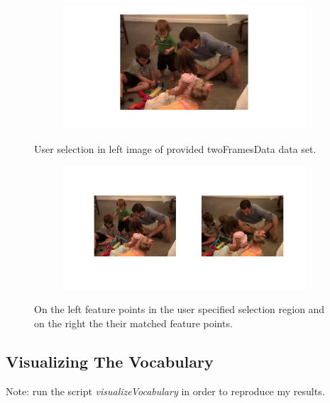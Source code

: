 \documentclass{paper}
\begin{document}
\begin{figure}[H]
\centering
\begin{subfigure}{1.0\textwidth}
\includegraphics[width=\textwidth]{figures/raw_matches/kids/selMatch2}
\end{subfigure}
\caption{User selection in left image of provided twoFramesData data set.}
\label{fig:kids2_raw_sel}
\end{figure}

\begin{figure}[H]
\centering
\begin{subfigure}{1.0\textwidth}
\includegraphics[width=\textwidth]{figures/raw_matches/kids/match2}
\end{subfigure}
\caption{On the left feature points in the user specified selection region and on the right the their matched feature points.}
\label{fig:kids_raw_matching}
\end{figure}



\subsection{Visualizing The Vocabulary}
Note: run the script \emph{visualizeVocabulary} in order to reproduce my results. \\
\end{document}
